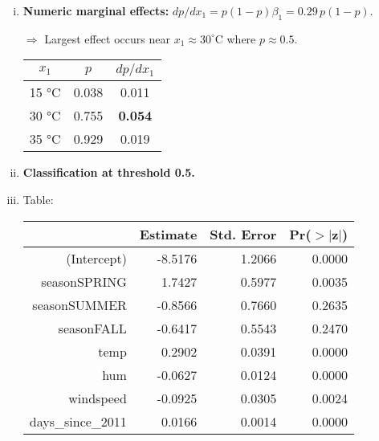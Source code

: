 {\begin{enumerate}[a)]
\begin{enumerate}[(i)]
    
    
    \item\textbf{Numeric marginal effects:}
    $
    dp/dx_1 = p(1-p)\beta_1 = 0.29\,p(1-p).
    $
    
    $\Rightarrow$ Largest effect occurs near \(x_1\approx30^\circ\text{C}\) where \(p\approx0.5\).
    
    \begin{center}
    \begin{tabular}{ccc}
    \toprule
    \(x_1\) & \(p\) & \(dp/dx_1\) \\
    \midrule
    15 °C & 0.038 & 0.011 \\
    30 °C & 0.755 & \textbf{0.054} \\
    35 °C & 0.929 & 0.019 \\
    \bottomrule
    \end{tabular}
    \end{center}
    
    
    \item\textbf{Classification at threshold 0.5.}
    
    
    
    
	\item Table:	
	\begin{table}[ht]
		\centering
		\begin{tabular}{rrrr}
			\hline
			& Estimate & Std. Error & Pr($>$$|$z$|$) \\ 
			\hline
			(Intercept) & -8.5176 & 1.2066 & 0.0000 \\ 
			seasonSPRING & 1.7427 & 0.5977 & 0.0035 \\ 
			seasonSUMMER & -0.8566 & 0.7660 & 0.2635 \\ 
			seasonFALL & -0.6417 & 0.5543 & 0.2470 \\ 
			temp & 0.2902 & 0.0391 & 0.0000 \\ 
			hum & -0.0627 & 0.0124 & 0.0000 \\ 
			windspeed & -0.0925 & 0.0305 & 0.0024 \\ 
			days\_since\_2011 & 0.0166 & 0.0014 & 0.0000 \\ 
			\hline
		\end{tabular}
	\end{table}
	

\end{enumerate}
\end{enumerate}}
